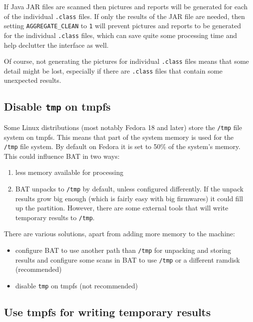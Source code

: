 \documentclass[10pt]{article}
\begin{document}
If Java JAR files are scanned then pictures and reports will be generated for
each of the individual \texttt{.class} files. If only the results of the JAR
file are needed, then setting \texttt{AGGREGATE\_CLEAN} to \texttt{1} will
prevent pictures and reports to be generated for the individual \texttt{.class}
files, which can save quite some processing time and help declutter the
interface as well.

Of course, not generating the pictures for individual \texttt{.class} files
means that some detail might be lost, especially if there are \texttt{.class}
files that contain some unexpected results.

\subsection{Disable \texttt{tmp} on tmpfs}

Some Linux distributions (most notably Fedora 18 and later) store the
\texttt{/tmp} file system on tmpfs. This means that part of the system memory
is used for the \texttt{/tmp} file system. By default on Fedora it is
set to 50\% of the system's memory. This could influence BAT in two ways:

\begin{enumerate}
\item less memory available for processing
\item BAT unpacks to \texttt{/tmp} by default, unless configured differently. If
the unpack results grow big enough (which is fairly easy with big firmwares) it
could fill up the partition. However, there are some external tools that will
write temporary results to \texttt{/tmp}.
\end{enumerate}

There are various solutions, apart from adding more memory to the machine:

\begin{itemize}
\item configure BAT to use another path than \texttt{/tmp} for unpacking and
storing results and configure some scans in BAT to use \texttt{/tmp} or a
different ramdisk (recommended)
\item disable \texttt{tmp} on tmpfs (not recommended)
\end{itemize}

\subsection{Use tmpfs for writing temporary results}
\end{document}
